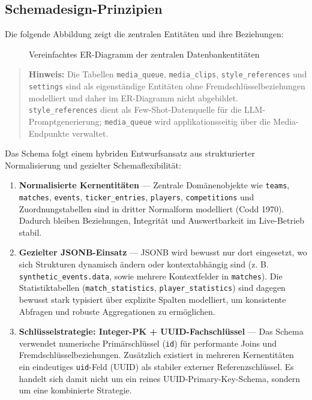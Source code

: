 \subsection{Schemadesign-Prinzipien}\label{schemadesign-prinzipien}

Die folgende Abbildung zeigt die zentralen Entitäten und ihre
Beziehungen:

\begin{figure}[H]
\centering
\DiagramDataModel
\caption{Vereinfachtes ER-Diagramm der zentralen Datenbankentitäten}
\label{fig:datamodel}
\end{figure}

\begin{quote}
\textbf{Hinweis:} Die Tabellen \texttt{media\_queue},
\texttt{media\_clips}, \texttt{style\_references} und \texttt{settings}
sind als eigenständige Entitäten ohne Fremdschlüsselbeziehungen
modelliert und daher im ER-Diagramm nicht abgebildet.
\texttt{style\_references} dient als Few-Shot-Datenquelle für die
LLM-Promptgenerierung; \texttt{media\_queue} wird applikationsseitig
über die Media-Endpunkte verwaltet.
\end{quote}

Das Schema folgt einem hybriden Entwurfsansatz aus strukturierter
Normalisierung und gezielter Schemaflexibilität:

\begin{enumerate}
\def\labelenumi{\arabic{enumi}.}
\tightlist
\item
  \textbf{Normalisierte Kernentitäten} --- Zentrale Domänenobjekte wie
  \texttt{teams}, \texttt{matches}, \texttt{events},
  \texttt{ticker\_entries}, \texttt{players}, \texttt{competitions} und
  Zuordnungstabellen sind in dritter Normalform modelliert (Codd 1970).
  Dadurch bleiben Beziehungen, Integrität und Auswertbarkeit im
  Live-Betrieb stabil.
\item
  \textbf{Gezielter JSONB-Einsatz} --- JSONB wird bewusst nur dort
  eingesetzt, wo sich Strukturen dynamisch ändern oder kontextabhängig
  sind (z. B. \texttt{synthetic\_events.data}, sowie mehrere
  Kontextfelder in \texttt{matches}). Die Statistiktabellen
  (\texttt{match\_statistics}, \texttt{player\_statistics}) sind dagegen
  bewusst stark typisiert über explizite Spalten modelliert, um
  konsistente Abfragen und robuste Aggregationen zu ermöglichen.
\item
  \textbf{Schlüsselstrategie: Integer-PK + UUID-Fachschlüssel} --- Das
  Schema verwendet numerische Primärschlüssel (\texttt{id}) für
  performante Joins und Fremdschlüsselbeziehungen. Zusätzlich existiert
  in mehreren Kernentitäten ein eindeutiges \texttt{uid}-Feld (UUID) als
  stabiler externer Referenzschlüssel. Es handelt sich damit nicht um
  ein reines UUID-Primary-Key-Schema, sondern um eine kombinierte
  Strategie.
\end{enumerate}

